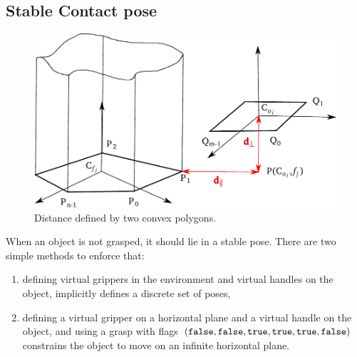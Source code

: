 \subsection{Stable Contact pose}\label{subsec:placement}

\begin{figure}
  \begin{center}
    \includegraphics[width=\linewidth]{figures/convex-shape-contact.pdf}
  \end{center}
  \caption{Distance defined by two convex polygons.}
  \label{fig:convex-shape-contact}
\end{figure}

When an object is not grasped, it should lie in a stable pose. There are two simple methods to enforce that:
\begin{enumerate}
\item defining virtual grippers in the environment and virtual handles on the object, implicitly defines a discrete set of poses,
\item defining a virtual gripper on a horizontal plane and a virtual handle on the object, and using a grasp with flags $(\texttt{false},\texttt{false},\texttt{true},\texttt{true},\texttt{true},\texttt{false})$ constrains the object to move on an infinite horizontal plane.
\end{enumerate}

